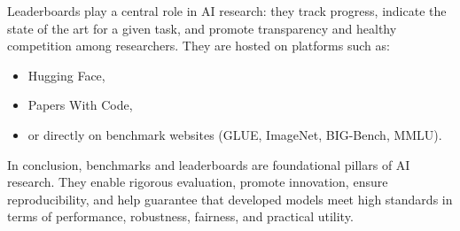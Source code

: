 \documentclass[12pt]{article}
\begin{document}
Leaderboards play a central role in AI research: they track progress, indicate the state of the art for a given task, and promote transparency and healthy competition among researchers. They are hosted on platforms such as:
\begin{itemize}[topsep=2pt,itemsep=1pt]
  \item Hugging Face,
  \item Papers With Code,
  \item or directly on benchmark websites (GLUE, ImageNet, BIG-Bench, MMLU).
\end{itemize}

In conclusion, benchmarks and leaderboards are foundational pillars of AI research. They enable rigorous evaluation, promote innovation, ensure reproducibility, and help guarantee that developed models meet high standards in terms of performance, robustness, fairness, and practical utility.
\end{document}
